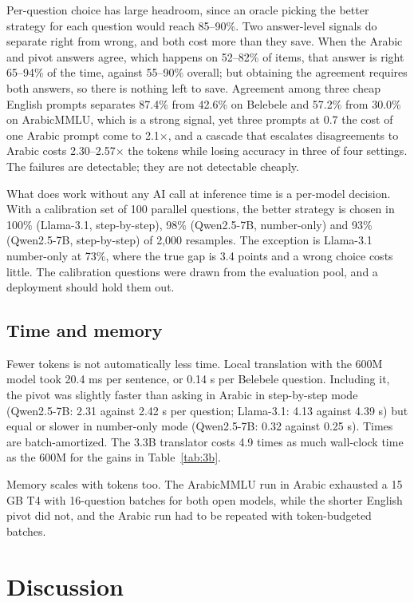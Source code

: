 \documentclass[conference,a4paper]{IEEEtran}
\begin{document}
Per-question choice has large headroom, since an oracle picking the better
strategy for each question would reach 85--90\%. Two answer-level signals do
separate right from wrong, and both cost more than they save. When the Arabic
and pivot answers agree, which happens on 52--82\% of items, that answer is
right 65--94\% of the time, against 55--90\% overall; but obtaining the
agreement requires both answers, so there is nothing left to save. Agreement
among three cheap English prompts separates 87.4\% from 42.6\% on Belebele and
57.2\% from 30.0\% on ArabicMMLU, which is a strong signal, yet three prompts
at 0.7 the cost of one Arabic prompt come to 2.1$\times$, and a cascade that
escalates disagreements to Arabic costs 2.30--2.57$\times$ the tokens while
losing accuracy in three of four settings. The failures are detectable; they
are not detectable cheaply.

What does work without any AI call at inference time is a per-model decision.
With a calibration set of 100 parallel questions, the better strategy is chosen
in 100\% (Llama-3.1, step-by-step), 98\% (Qwen2.5-7B, number-only) and 93\%
(Qwen2.5-7B, step-by-step) of 2,000 resamples. The exception is Llama-3.1
number-only at 73\%, where the true gap is 3.4 points and a wrong choice costs
little. The calibration questions were drawn from the evaluation pool, and a
deployment should hold them out.

\subsection{Time and memory}

Fewer tokens is not automatically less time. Local translation with the 600M
model took 20.4 ms per sentence, or 0.14 s per Belebele question. Including it,
the pivot was slightly faster than asking in Arabic in step-by-step mode
(Qwen2.5-7B: 2.31 against 2.42 s per question; Llama-3.1: 4.13 against 4.39 s)
but equal or slower in number-only mode (Qwen2.5-7B: 0.32 against 0.25 s).
Times are batch-amortized. The 3.3B translator costs 4.9 times as much
wall-clock time as the 600M for the gains in Table~\ref{tab:3b}.

Memory scales with tokens too. The ArabicMMLU run in Arabic exhausted a 15 GB
T4 with 16-question batches for both open models, while the shorter English
pivot did not, and the Arabic run had to be repeated with token-budgeted
batches.

\section{Discussion}
\end{document}
